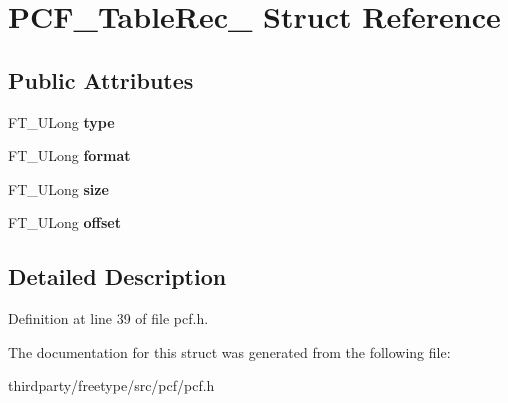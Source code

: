\hypertarget{struct_p_c_f___table_rec__}{}\section{P\+C\+F\+\_\+\+Table\+Rec\+\_\+ Struct Reference}
\label{struct_p_c_f___table_rec__}
\subsection*{Public Attributes}
\begin{DoxyCompactItemize}
\item 
\mbox{\label{struct_p_c_f___table_rec___ada89100bef8a0e316501e9a07dbfc45d}} 
F\+T\+\_\+\+U\+Long {\bfseries type}
\item 
\mbox{\label{struct_p_c_f___table_rec___a212d6854709410db70c12671da5c282b}} 
F\+T\+\_\+\+U\+Long {\bfseries format}
\item 
\mbox{\label{struct_p_c_f___table_rec___a6a340dbfbed9846071a730ce76dd8881}} 
F\+T\+\_\+\+U\+Long {\bfseries size}
\item 
\mbox{\label{struct_p_c_f___table_rec___a6b77ef2cf8a89a1a709f12aae718fff9}} 
F\+T\+\_\+\+U\+Long {\bfseries offset}
\end{DoxyCompactItemize}


\subsection{Detailed Description}


Definition at line 39 of file pcf.\+h.



The documentation for this struct was generated from the following file\+:\begin{DoxyCompactItemize}
\item 
thirdparty/freetype/src/pcf/pcf.\+h\end{DoxyCompactItemize}

